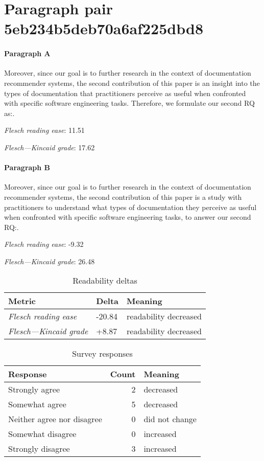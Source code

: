 \newpage
\section{Paragraph pair 5eb234b5deb70a6af225dbd8}
\paragraph{Paragraph A}
Moreover, since our goal is to further research in the context of documentation recommender systems, the second contribution of this paper is an insight into the types of documentation that practitioners perceive as useful when confronted with specific software engineering tasks. Therefore, we formulate our second RQ as:.\par\medskip
\emph{Flesch reading ease}: 11.51\par
\emph{Flesch---Kincaid grade}: 17.62

\paragraph{Paragraph B}
Moreover, since our goal is to further research in the context of documentation recommender systems, the second contribution of this paper is a study with practitioners to understand what types of documentation they perceive as useful when confronted with specific software engineering tasks, to answer our second RQ:.\par\medskip
\emph{Flesch reading ease}: -9.32\par
\emph{Flesch---Kincaid grade}: 26.48

\bigskip\begin{table}[!h]
\centering
\begin{tabular}{lll}
\toprule
               \textbf{Metric} & \textbf{Delta} &       \textbf{Meaning} \\
\midrule
    \emph{Flesch reading ease} &         -20.84 &  readability decreased \\
 \emph{Flesch---Kincaid grade} &          +8.87 &  readability decreased \\
\bottomrule
\end{tabular}
\caption*{Readability deltas}\end{table}

\begin{table}[!h]
\centering
\begin{tabular}{lrl}
\toprule
          \textbf{Response} &  \textbf{Count} & \textbf{Meaning} \\
\midrule
             Strongly agree &               2 &        decreased \\
             Somewhat agree &               5 &        decreased \\
 Neither agree nor disagree &               0 &   did not change \\
          Somewhat disagree &               0 &        increased \\
          Strongly disagree &               3 &        increased \\
\bottomrule
\end{tabular}
\caption*{Survey responses}\end{table}


